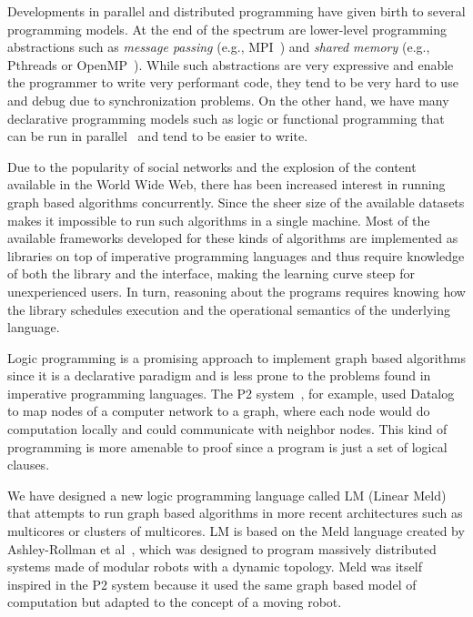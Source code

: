 
Developments in parallel and distributed programming have given birth to several programming models.
At the end of the spectrum are lower-level programming abstractions such as
\emph{message passing} (e.g., MPI~\cite{gabriel04-open-mpi}) and \emph{shared memory}
(e.g., Pthreads or OpenMP~\cite{Chapman-2007-UOP-1370966}).
While such abstractions are very expressive and enable the programmer to write very performant code,
they tend to be very hard to use and debug due to synchronization problems.
On the other hand, we have many declarative programming models such as logic or functional programming
that can be run in parallel~\cite{Gupta:2001:PEP:504083.504085,Blelloch:1996:PPA:227234.227246} and tend to be easier to write.

Due to the popularity of social networks and the explosion of the content available in the World Wide Web, there has been
increased interest in running graph based algorithms concurrently. Since the sheer size of
the available datasets makes it impossible to run such algorithms in a single machine.
Most of the available frameworks developed for these kinds of algorithms are implemented as libraries on top
of imperative programming languages and thus require knowledge of both the library and the interface, making
the learning curve steep for unexperienced users. In turn, reasoning about the programs requires knowing how
the library schedules execution and the operational semantics of the underlying language.

Logic programming is a promising approach to implement graph based algorithms since it is a declarative paradigm
and is less prone to the problems found in imperative programming languages.
The P2 system~\cite{Loo-condie-garofalakis-p2}, for example, used Datalog to map nodes of a computer network
to a graph, where each node would do computation locally and could communicate with neighbor nodes.
This kind of programming is more amenable to proof since a program is just a set of logical clauses.

We have designed a new logic programming language called LM (Linear Meld) that attempts to run graph based
algorithms in more recent architectures such as multicores or clusters of multicores. LM is based on the Meld language created by
Ashley-Rollman et al~\cite{ashley-rollman-derosa-iros07wksp,ashley-rollman-iclp09}, which was designed to
program massively distributed systems made of modular robots with a dynamic topology. Meld was itself inspired
in the P2 system because it used the same graph based model of computation but adapted to the concept of a moving
robot.


